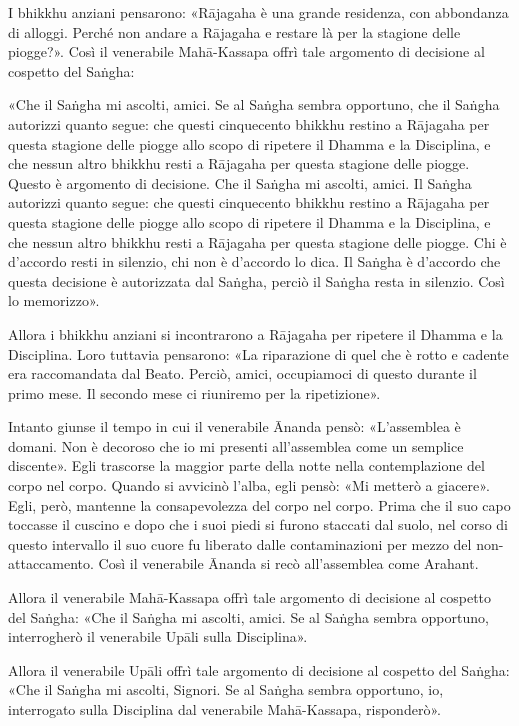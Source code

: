 I bhikkhu anziani pensarono: «Rājagaha è una grande residenza, con abbondanza di
alloggi. Perché non andare a Rājagaha e restare là per la stagione delle
piogge?». Così il venerabile Mahā-Kassapa offrì tale argomento di decisione al
cospetto del Saṅgha:

«Che il Saṅgha mi ascolti, amici. Se al Saṅgha sembra opportuno, che il Saṅgha
autorizzi quanto segue: che questi cinquecento bhikkhu restino a Rājagaha per
questa stagione delle piogge allo scopo di ripetere il Dhamma e la Disciplina, e
che nessun altro bhikkhu resti a Rājagaha per questa stagione delle piogge.
Questo è argomento di decisione. Che il Saṅgha mi ascolti, amici. Il Saṅgha
autorizzi quanto segue: che questi cinquecento bhikkhu restino a Rājagaha per
questa stagione delle piogge allo scopo di ripetere il Dhamma e la Disciplina, e
che nessun altro bhikkhu resti a Rājagaha per questa stagione delle piogge. Chi
è d’accordo resti in silenzio, chi non è d’accordo lo dica. Il Saṅgha è
d’accordo che questa decisione è autorizzata dal Saṅgha, perciò il Saṅgha resta
in silenzio. Così lo memorizzo».

Allora i bhikkhu anziani si incontrarono a Rājagaha per ripetere il Dhamma e la
Disciplina. Loro tuttavia pensarono: «La riparazione di quel che è rotto e
cadente era raccomandata dal Beato. Perciò, amici, occupiamoci di questo durante
il primo mese. Il secondo mese ci riuniremo per la ripetizione».

Intanto giunse il tempo in cui il venerabile Ānanda pensò: «L’assemblea è
domani. Non è decoroso che io mi presenti all’assemblea come un semplice
discente». Egli trascorse la maggior parte della notte nella contemplazione del
corpo nel corpo. Quando si avvicinò l’alba, egli pensò: «Mi metterò a giacere».
Egli, però, mantenne la consapevolezza del corpo nel corpo. Prima che il suo
capo toccasse il cuscino e dopo che i suoi piedi si furono staccati dal suolo,
nel corso di questo intervallo il suo cuore fu liberato dalle contaminazioni per
mezzo del non-attaccamento. Così il venerabile Ānanda si recò all’assemblea come
Arahant.

Allora il venerabile Mahā-Kassapa offrì tale argomento di decisione al cospetto
del Saṅgha: «Che il Saṅgha mi ascolti, amici. Se al Saṅgha sembra opportuno,
interrogherò il venerabile Upāli sulla Disciplina».

Allora il venerabile Upāli offrì tale argomento di decisione al cospetto del
Saṅgha: «Che il Saṅgha mi ascolti, Signori. Se al Saṅgha sembra opportuno, io,
interrogato sulla Disciplina dal venerabile Mahā-Kassapa, risponderò».

